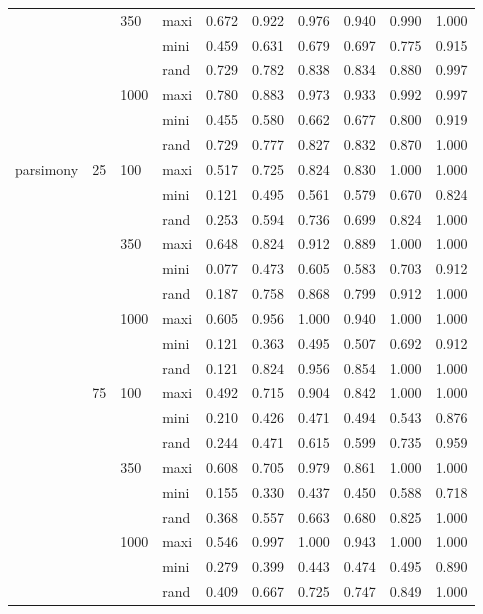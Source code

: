 \begin{longtable}{llllrrrrrr}
   &  & 350 & maxi & 0.672 & 0.922 & 0.976 & 0.940 & 0.990 & 1.000 \\ 
   &  &  & mini & 0.459 & 0.631 & 0.679 & 0.697 & 0.775 & 0.915 \\ 
   &  &  & rand & 0.729 & 0.782 & 0.838 & 0.834 & 0.880 & 0.997 \\ 
   &  & 1000 & maxi & 0.780 & 0.883 & 0.973 & 0.933 & 0.992 & 0.997 \\ 
   &  &  & mini & 0.455 & 0.580 & 0.662 & 0.677 & 0.800 & 0.919 \\ 
   &  &  & rand & 0.729 & 0.777 & 0.827 & 0.832 & 0.870 & 1.000 \\ 
  parsimony & 25 & 100 & maxi & 0.517 & 0.725 & 0.824 & 0.830 & 1.000 & 1.000 \\ 
   &  &  & mini & 0.121 & 0.495 & 0.561 & 0.579 & 0.670 & 0.824 \\ 
   &  &  & rand & 0.253 & 0.594 & 0.736 & 0.699 & 0.824 & 1.000 \\ 
   &  & 350 & maxi & 0.648 & 0.824 & 0.912 & 0.889 & 1.000 & 1.000 \\ 
   &  &  & mini & 0.077 & 0.473 & 0.605 & 0.583 & 0.703 & 0.912 \\ 
   &  &  & rand & 0.187 & 0.758 & 0.868 & 0.799 & 0.912 & 1.000 \\ 
   &  & 1000 & maxi & 0.605 & 0.956 & 1.000 & 0.940 & 1.000 & 1.000 \\ 
   &  &  & mini & 0.121 & 0.363 & 0.495 & 0.507 & 0.692 & 0.912 \\ 
   &  &  & rand & 0.121 & 0.824 & 0.956 & 0.854 & 1.000 & 1.000 \\ 
   & 75 & 100 & maxi & 0.492 & 0.715 & 0.904 & 0.842 & 1.000 & 1.000 \\ 
   &  &  & mini & 0.210 & 0.426 & 0.471 & 0.494 & 0.543 & 0.876 \\ 
   &  &  & rand & 0.244 & 0.471 & 0.615 & 0.599 & 0.735 & 0.959 \\ 
   &  & 350 & maxi & 0.608 & 0.705 & 0.979 & 0.861 & 1.000 & 1.000 \\ 
   &  &  & mini & 0.155 & 0.330 & 0.437 & 0.450 & 0.588 & 0.718 \\ 
   &  &  & rand & 0.368 & 0.557 & 0.663 & 0.680 & 0.825 & 1.000 \\ 
   &  & 1000 & maxi & 0.546 & 0.997 & 1.000 & 0.943 & 1.000 & 1.000 \\ 
   &  &  & mini & 0.279 & 0.399 & 0.443 & 0.474 & 0.495 & 0.890 \\ 
   &  &  & rand & 0.409 & 0.667 & 0.725 & 0.747 & 0.849 & 1.000 \\ 

\end{longtable}
